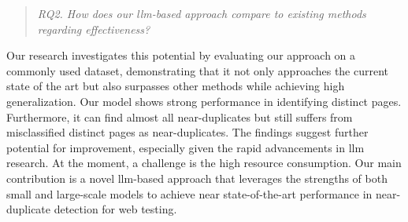 \begin{quote}
    \label{quote:RQ2}
    \emph{RQ2. How does our \ac{llm}-based approach compare to existing methods regarding effectiveness?}
\end{quote}

Our research investigates this potential by evaluating our approach on a commonly used dataset, demonstrating that it not only approaches the current state of the art but also surpasses other methods while achieving high generalization. Our model shows strong performance in identifying distinct pages. Furthermore, it can find almost all near-duplicates but still suffers from misclassified distinct pages as near-duplicates. The findings suggest further potential for improvement, especially given the rapid advancements in \ac{llm} research. At the moment, a challenge is the high resource consumption. Our main contribution is a novel \ac{llm}-based approach that leverages the strengths of both small and large-scale models to achieve near state-of-the-art performance in near-duplicate detection for web testing.